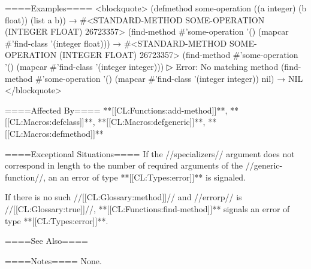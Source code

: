 ====Examples====
<blockquote> (defmethod some-operation ((a integer) (b float)) (list a b)) → #<STANDARD-METHOD SOME-OPERATION (INTEGER FLOAT) 26723357> (find-method #'some-operation '() (mapcar #'find-class '(integer float))) → #<STANDARD-METHOD SOME-OPERATION (INTEGER FLOAT) 26723357> (find-method #'some-operation '() (mapcar #'find-class '(integer integer)))
▷ Error: No matching method (find-method #'some-operation '() (mapcar #'find-class '(integer integer)) nil) → NIL </blockquote>

====Affected By====
**[[CL:Functions:add-method]]**, **[[CL:Macros:defclass]]**, **[[CL:Macros:defgeneric]]**, **[[CL:Macros:defmethod]]**

====Exceptional Situations====
If the //specializers// argument does not correspond in length to the number of required arguments of the //generic-function//, an an error of type **[[CL:Types:error]]** is signaled.

If there is no such //[[CL:Glossary:method]]// and //errorp// is //[[CL:Glossary:true]]//, **[[CL:Functions:find-method]]** signals an error of type **[[CL:Types:error]]**.

====See Also====
{\secref\SpecializerQualifierAgreement}

====Notes====
None.


